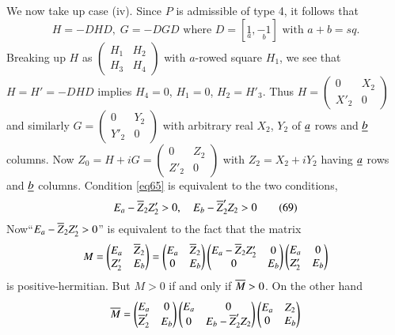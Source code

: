 We now take up case (iv). Since $P$ is admissible of type 4, it
follows that
$$
H=-DHD, \; G=-DGD\text{ where } D=[\underset{a}{1},\underset{b}{-1}]
\text{ with } a+b=sq.
$$
Breaking up $H$ as $\left(\begin{smallmatrix} H_{1} & H_{2}\\ H_{3} &
  H_{4}
\end{smallmatrix}\right)$ with $a$-rowed square $H_{1}$, we see that
$H=H'=-DHD$ implies $H_{4}=0$, $H_{1}=0$, $H_{2}=H'_{3}$. Thus
$H=\left(\begin{smallmatrix} 0 & X_{2}\\ X'_{2} & 0
\end{smallmatrix}\right)$ and similarly $G=\left(\begin{smallmatrix} 0
  & Y_{2}\\ Y'_{2} & 0\end{smallmatrix}\right)$ with arbitrary real
  $X_{2}$, $Y_{2}$ of $\underline{a}$ rows and $\underline{b}$ columns. Now
  $Z_{0}=H+iG=\left(\begin{smallmatrix} 0 & Z_{2}\\ Z'_{2} & 0
  \end{smallmatrix}\right)$ with $Z_{2}=X_{2}+iY_{2}$ having $\underline{a}$
  rows and $\underline{b}$ columns. Condition \eqref{eq65} is equivalent to the
  two conditions,
\begin{equation*}
E_{a}-\overline{Z}_{2}Z'_{2}>0,\quad E_{b}-\overline{Z}'_{2}Z_{2}>0\tag{69}\label{eq69}
\end{equation*} 
Now\pageoriginale ``$E_{a}-\overline{Z}_{2}Z'_{2}>0$'' is equivalent to the
fact that the matrix 
$$
M=
\begin{pmatrix}
E_{a} & \overline{Z}_{2}\\
Z'_{2} & E_{b}
\end{pmatrix}
=
\begin{pmatrix}
E_{a} & \overline{Z}_{2}\\
0 & E_{b}
\end{pmatrix}
\begin{pmatrix}
E_{a}-\overline{Z}_{2}Z'_{2} & 0\\
0 & E_{b}
\end{pmatrix}
\begin{pmatrix}
E_{a} & 0\\
Z'_{2} & E_{b}
\end{pmatrix}
$$
is positive-hermitian. But $M>0$ if and only if $\overline{M}>0$. On the
other hand 
$$
\overline{M}=
\begin{pmatrix}
E_{a} & 0\\
\overline{Z}'_{2} & E_{b}
\end{pmatrix}
\begin{pmatrix}
E_{a} & 0\\
0 & E_{b}-\overline{Z}'_{2}Z_{2}
\end{pmatrix}
\begin{pmatrix}
E_{a} & Z_{2}\\
0 & E_{b}
\end{pmatrix}
$$
